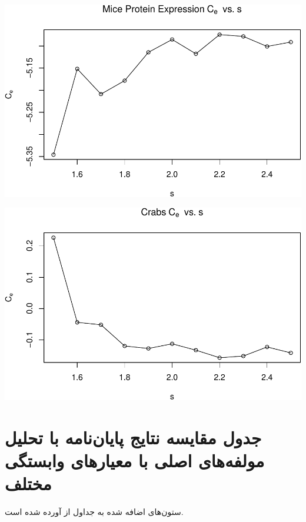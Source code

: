\begin{center}\includegraphics[width=1\linewidth]{Report_files/figure-latex/unnamed-chunk-26-6} \end{center}

\begin{center}\includegraphics[width=1\linewidth]{Report_files/figure-latex/unnamed-chunk-26-7} \end{center}



\section{
جدول مقایسه نتایج پایان‌نامه با تحلیل مولفه‌های اصلی با معیارهای وابستگی مختلف
}

ستون‌های اضافه شده به جداول از 
\cite{spisheh2018}
آورده شده است.

